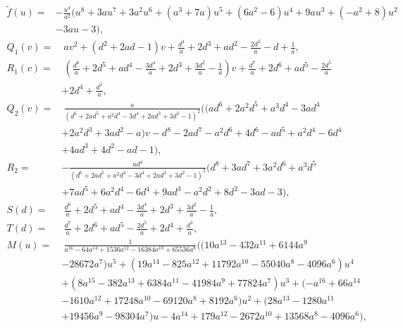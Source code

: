 \documentclass{gtpart}
\theoremstyle{definition}
\theoremstyle{remark}
\newcommand{\Tf}{\widetilde{f}}
\begin{document}
\begin{equation*}
\begin{split}
 \Tf(u) = & - \frac{u^4}{a^2} \big( u^8 + 3 a u^7 + 3 a^2 u^6 + (a^3 + 7 a) u^5 + (6 a^2 - 6) u^4 + 9 a u^3 + (-a^2 + 8) u^2 \\
          & - 3 a u - 3 \big), 
\end{split}
\end{equation*}
\begin{equation*}
\begin{split}
 Q_1(v) = & ~ a v^2 + (d^2 + 2 a d - 1) v + \frac{d^4}{a} + 2 d^3 + a d^2 - \frac{2 d^2}{a} - d + \frac{1}{a}, \\
 R_1(v) = & ~ (\frac{d^6}{a} + 2 d^5 + a d^4 - \frac{3 d^4}{a} + 2 d^3 + \frac{3 d^2}{a} - \frac{1}{a}) v + \frac{d^7}{a} + 2 d^6 + a d^5 - \frac{2 d^5}{a} \\
          & + 2 d^4 + \frac{d^3}{a}, \\
 Q_2(v) = & ~ \frac{a}{(d^6 + 2 a d^5 + a^2 d^4 - 3 d^4 + 2 a d^3 + 3 d^2 - 1)^2} \big( (a d^6 + 2 a^2 d^5 + a^3 d^4 - 3 a d^4 \\
          & + 2 a^2 d^3 + 3 a d^2 - a) v - d^8 - 2 a d^7 - a^2 d^6 + 4 d^6 - a d^5 + a^2 d^4 - 6 d^4 \\
          & + 4 a d^3 + 4 d^2 - a d - 1 \big), \\
 R_2 = & - \frac{a d^4}{(d^6 + 2 a d^5 + a^2 d^4 - 3 d^4 + 2 a d^3 + 3 d^2 - 1)^2} (d^8 + 3 a d^7 + 3 a^2 d^6 + a^3 d^5 \\
       & + 7 a d^5 + 6 a^2 d^4 - 6 d^4 + 9 a d^3 - a^2 d^2 + 8 d^2 - 3 a d - 3), \\
 S(d) = & ~ \frac{d^6}{a} + 2 d^5 + a d^4 - \frac{3 d^4}{a} + 2 d^3 + \frac{3 d^2}{a} - \frac{1}{a}, \\
 T(d) = & ~ \frac{d^7}{a} + 2 d^6 + a d^5 - \frac{2 d^5}{a} + 2 d^4 + \frac{d^3}{a}, \\
 M(u) = & ~ \frac{1}{a^{16} - 64 a^{14} + 1536 a^{12} - 16384 a^{10} + 65536 a^8} \big( (10 a^{13} - 432 a^{11} + 6144 a^9 \\
        & - 28672 a^7) u^5 + (19 a^{14} - 825 a^{12} + 11792 a^{10} - 55040 a^8 - 4096 a^6) u^4 \\
        & + (8 a^{15} - 382 a^{13} + 6384 a^{11} - 41984 a^9 + 77824 a^7) u^3 + (-a^{16} + 66 a^{14} \\
        & - 1610 a^{12} + 17248 a^{10} - 69120 a^8 + 8192 a^6) u^2 + (28 a^{13} - 1280 a^{11} \\
        & + 19456 a^9 - 98304 a^7) u -4 a^{14} + 179 a^{12} - 2672 a^{10} + 13568 a^8 - 4096 a^6 \big), \\

\end{split}
\end{equation*}
\end{document}
